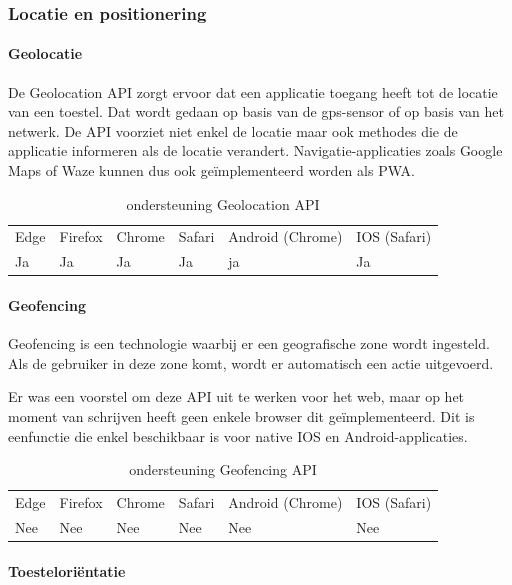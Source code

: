 \subsubsection{Locatie en positionering}

\paragraph{Geolocatie}
De Geolocation API \autocite{Popescu2020} zorgt ervoor dat een applicatie toegang heeft tot de locatie van een toestel. Dat wordt gedaan op basis van de gps-sensor of op basis van het netwerk. 
De API voorziet niet enkel de locatie maar ook methodes die de applicatie informeren als de locatie verandert.
Navigatie-applicaties zoals Google Maps of Waze kunnen dus ook geïmplementeerd worden als PWA.

\begin{table}[H]
	\centering
	\begin{tabular}{llllll}
		Edge & Firefox & Chrome & Safari & Android (Chrome) & IOS (Safari) \\
		Ja   & Ja      &  Ja     & Ja     & ja               & Ja          
	\end{tabular}	
	\caption{ondersteuning Geolocation API}
\end{table}


\paragraph{Geofencing}
Geofencing is een technologie waarbij er een geografische zone wordt ingesteld. Als de gebruiker in deze zone komt, wordt er automatisch een actie uitgevoerd. 

Er was een voorstel om deze API \autocite{Kruisselbrink2020a} uit te werken voor het web, maar op het moment van schrijven heeft geen enkele browser dit geïmplementeerd. Dit is eenfunctie die enkel beschikbaar is voor native IOS en Android-applicaties.

\begin{table}[H]
	\centering
	\begin{tabular}{llllll}
		Edge & Firefox & Chrome & Safari & Android (Chrome) & IOS (Safari) \\
		Nee   & Nee      &  Nee     & Nee     & Nee               & Nee          
	\end{tabular}	
	\caption{ondersteuning Geofencing API}
\end{table}

\paragraph{Toesteloriëntatie }

